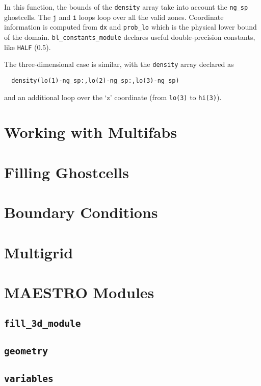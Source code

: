 \noindent In this function, the bounds of the {\tt density} array
take into account the {\tt ng\_sp} ghostcells.  The {\tt j} and {\tt i}
loops loop over all the valid zones.  Coordinate information is 
computed from {\tt dx} and {\tt prob\_lo} which is the physical
lower bound of the domain.  {\tt bl\_constants\_module} declares
useful double-precision constants, like {\tt HALF} (0.5).

The three-dimensional case is similar, with the {\tt density} array
declared as 
\begin{verbatim}
  density(lo(1)-ng_sp:,lo(2)-ng_sp:,lo(3)-ng_sp)
\end{verbatim}
and an additional loop over the `z' coordinate (from {\tt lo(3)} to
{\tt hi(3)}).

\section{Working with Multifabs}


\section{Filling Ghostcells}


\section{Boundary Conditions}


\section{Multigrid}


\section{MAESTRO Modules}

\subsection{{\tt fill\_3d\_module}}

\subsection{{\tt geometry}}

\subsection{{\tt variables}}





